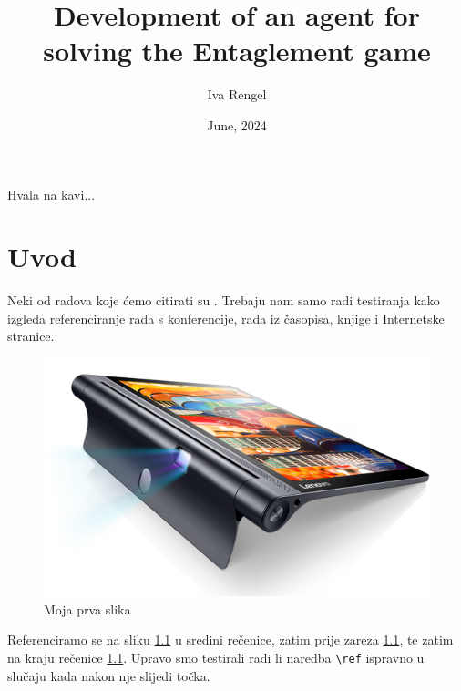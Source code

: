\documentclass[zavrsnirad]{fer}
\title{Development of an agent for solving the Entaglement game}
\author{Iva Rengel}
\date{June, 2024}
\begin{document}
\maketitle






\begin{zahvale}
  Hvala na kavi...
\end{zahvale}


\mainmatter


\tableofcontents


\chapter{Uvod}
\label{pog:uvod}

Neki od radova koje ćemo citirati su \cite{6248073,6247753,ghiglia_pritt_phase_unwrapping,hartley2003multiple,4250461,123DCatch}.
Trebaju nam samo radi testiranja kako izgleda referenciranje rada s konferencije, rada iz časopisa, knjige i Internetske stranice.

\begin{figure}[htb]
  \centering
  \includegraphics[width=0.38\linewidth]{Figures/lenovo_yoga_tab3_pro_front.png} 
  \caption{Moja prva slika}
  \label{slk:prvaslika}
\end{figure}

Referenciramo se na sliku \ref{slk:prvaslika} u sredini rečenice, zatim prije zareza \ref{slk:prvaslika}, te zatim na kraju rečenice \ref{slk:prvaslika}.
Upravo smo testirali radi li naredba \verb|\ref| ispravno u slučaju kada nakon nje slijedi točka.
\end{document}
